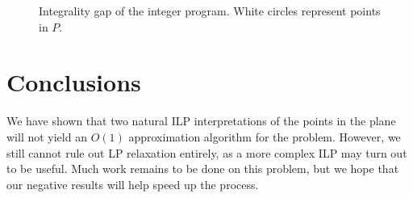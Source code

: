 \documentclass[11pt]{article}
\begin{document}
\begin{figure}
\centering
{}
\caption{Integrality gap of the integer program. White circles represent points in $P$.}
\label{fig:integralitygap}
\end{figure}

\section{Conclusions}

We have shown that two natural ILP interpretations of the points in the plane will not yield an $O(1)$ approximation algorithm for the problem. However, we still cannot rule out LP relaxation entirely, as a more complex ILP may turn out to be useful. Much work remains to be done on this problem, but we hope that our negative results will help speed up the process.



\end{document}
